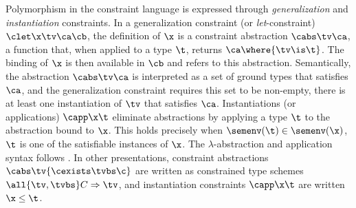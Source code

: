 \documentclass[acmsmall,screen,nonacm%
\Anonymous{,anonymous}{}%
\Final{}{,review}%
]{acmart}
\begin{document}

Polymorphism in the constraint language is expressed through
\emph{generalization} and \emph{instantiation} constraints. In a generalization
constraint (or \emph{let}-constraint) $\clet \x \tv \ca \cb$, the definition of
$\x$ is a constraint abstraction $\cabs \tv \ca$, a function that, when applied
to a type $\t$, returns $\ca \where {\tv \is \t}$. The binding of $\x$ is then
available in $\cb$ and refers to this abstraction. Semantically, the
abstraction $\cabs \tv \ca$ is interpreted as a set of ground types that
satisfies $\ca$, and the generalization constraint requires this set to be
non-empty, \ie there is at least one instantiation of $\tv$ that satisfies
$\ca$.
%
Instantiations (or applications) $\capp \x \t$ eliminate abstractions by
applying a type $\t$ to the abstraction bound to $\x$. This holds precisely
when $\semenv(\t) \in \semenv(\x)$, \ie $\t$ is one of the satisfiable
instances of $\x$. The $\lambda$-abstraction and application syntax follows
\citet*{Pottier/inferno@icfp2014}. In other presentations, constraint
abstractions $\cabs \tv {\cexists \tvbs \c}$ are written as constrained type
schemes $\all {\tv, \tvbs} C \Rightarrow \tv$, and instantiation constraints
$\capp \x \t$ are written $\x \leq \t$.

\end{document}
